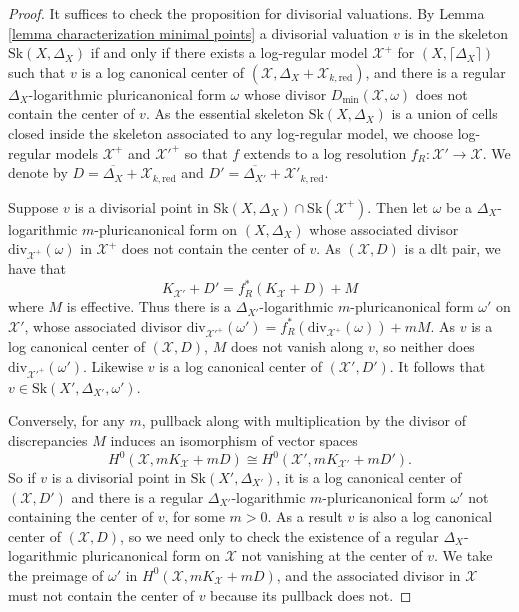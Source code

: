 \documentclass{amsart}%
\numberwithin{equation}{subsection}
\theoremstyle{plain2}
\theoremstyle{definition2}
\theoremstyle{stepstyle}
\theoremstyle{point}
\theoremstyle{subpoint}
\newcommand{\cX}{\ensuremath{\mathscr{X}}}
\newcommand{\redu}{\mathrm{red}}
\newcommand{\divisor}{\mathrm{div}}
\newcommand{\Sk}{\mathrm{Sk}}
\begin{document}
\begin{proof}
It suffices to check the proposition for divisorial valuations. By Lemma \ref{lemma characterization minimal points} a divisorial valuation $v$ is in the skeleton $\Sk(X,\Delta_X)$ if and only if there exists a log-regular model $\cX^+$ for $(X,\lceil\Delta_X\rceil)$ such that $v$ is a log canonical center of $(\cX, \Delta_X + \cX_{k,\redu})$, and there is a regular $\Delta_X$-logarithmic pluricanonical form $\omega$ whose divisor $D_{\min}(\cX,\omega)$ does not contain the center of $v$. As the essential skeleton $\Sk(X,\Delta_X)$ is a union of cells closed inside the skeleton associated to any log-regular model, we choose log-regular models $\cX^+$ and $\cX'^+$ so that $f$ extends to a log resolution $f_R \colon \cX' \to \cX$. We denote by $D = \overline{\Delta_X} + \cX_{k,\redu}$ and $D'=\overline{\Delta_{X'}} + \cX'_{k,\redu}$. 

Suppose $v$ is a divisorial point in $\Sk(X, \Delta_X) \cap \Sk(\cX^+)$. Then let $\omega$ be a $\Delta_X$-logarithmic $m$-pluricanonical form on $(X,\Delta_X)$ whose associated divisor $\divisor_{\cX^+}(\omega)$ in $\cX^+$ does not contain the center of $v$. As $(\cX, D)$ is a dlt pair, we have that $$K_{\cX'}+D'= f_R^*(K_{\cX}+D)+M$$ where $M$ is effective. Thus there is a $\Delta_{X'}$-logarithmic $m$-pluricanonical form $\omega'$ on $\cX'$, whose associated divisor $\divisor_{\cX'^+}(\omega')=f^*_R(\divisor_{\cX^+}(\omega))+mM$. As $v$ is a log canonical center of $(\cX,D)$, $M$ does not vanish along $v$, so neither does $\divisor_{\cX'^+}(\omega')$. Likewise $v$ is a log canonical center of $(\cX', D')$. It follows that $v \in \Sk(X',\Delta_{X'},\omega')$.

Conversely, for any $m$, pullback along with multiplication by the divisor of discrepancies $M$ induces an isomorphism of vector spaces $$H^0(\cX, mK_{\cX}+mD) \cong H^0(\cX', mK_{\cX'}+mD').$$ So if $v$ is a divisorial point in $\Sk(X', \Delta_{X'})$, it is a log canonical center of $(\cX, D')$ and there is a regular $\Delta_{X'}$-logarithmic $m$-pluricanonical form $\omega'$ not containing the center of $v$, for some $m>0$. As a result $v$ is also a log canonical center of $(\cX, D)$, so we need only to check the existence of a regular $\Delta_X$-logarithmic pluricanonical form on $\cX$ not vanishing at the center of $v$. We take the preimage of $\omega'$ in $H^0(\cX, mK_{\cX}+mD)$, and the associated divisor in $\cX$ must not contain the center of $v$ because its pullback does not.
\end{proof}
\end{document}
